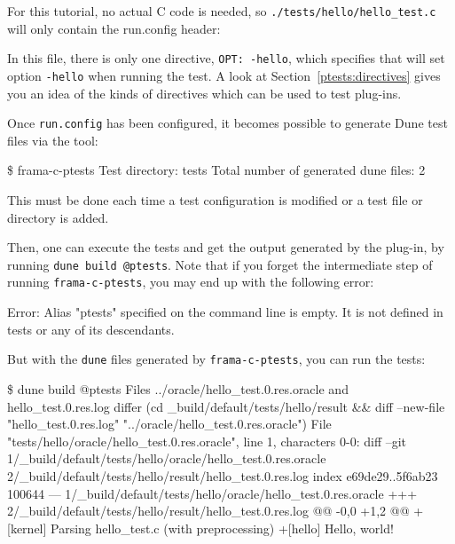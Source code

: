 For this tutorial, no actual C code is needed, so
\texttt{./tests/hello/hello\_test.c} will only contain the run.config header:



In this file, there is only one directive,
\texttt{OPT: -hello}, which specifies that
\framac will set option \texttt{-hello} when running the test.
A look at Section~\ref{ptests:directives} gives you an idea of the kinds of
directives which can be used to test plug-ins.

Once \texttt{run.config} has been configured, it becomes possible to generate
Dune test files via the \ptests tool:

\begin{shell}[breaklines=true]
\$ frama-c-ptests
Test directory: tests
Total number of generated dune files: 2
\end{shell}

This must be done each time a test configuration is modified or a test file or
directory is added.

Then, one can execute the tests and get the output generated by the plug-in,
by running \verb|dune build @ptests|. Note that if you forget the intermediate
step of running \verb|frama-c-ptests|, you may end up with the following error:

\begin{logs}[breaklines=true]
Error: Alias "ptests" specified on the command line is empty.
It is not defined in tests or any of its descendants.
\end{logs}

But with the \texttt{dune} files generated by \verb|frama-c-ptests|, you can
run the tests:

\begin{frama-c-commands}[breaklines=true]
\$ dune build @ptests
Files ../oracle/hello_test.0.res.oracle and hello_test.0.res.log differ
(cd _build/default/tests/hello/result && diff --new-file "hello_test.0.res.log"
"../oracle/hello_test.0.res.oracle")
File "tests/hello/oracle/hello_test.0.res.oracle", line 1, characters 0-0:
diff --git 1/_build/default/tests/hello/oracle/hello_test.0.res.oracle
            2/_build/default/tests/hello/result/hello_test.0.res.log
index e69de29..5f6ab23 100644
--- 1/_build/default/tests/hello/oracle/hello_test.0.res.oracle
+++ 2/_build/default/tests/hello/result/hello_test.0.res.log
@@ -0,0 +1,2 @@
+[kernel] Parsing hello_test.c (with preprocessing)
+[hello] Hello, world!
\end{frama-c-commands}

